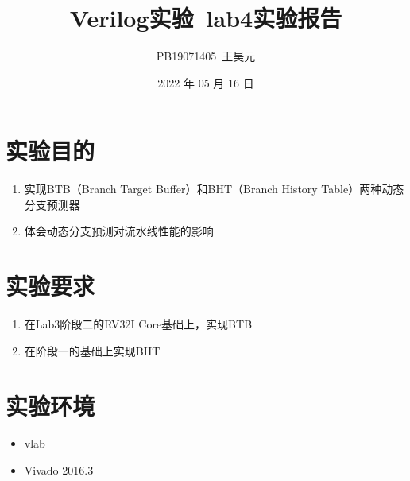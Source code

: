 \documentclass[UTF8]{article}
\title{Verilog实验\ lab4实验报告}
\author{PB19071405\ 王昊元}
\date{2022 年 05 月 16 日}
\begin{document}
    \maketitle
    \section{实验目的}
    \begin{enumerate}
        \item 实现BTB（Branch Target Buffer）和BHT（Branch History Table）两种动态分支预测器
        \item 体会动态分支预测对流水线性能的影响
    \end{enumerate}
    \section{实验要求}
    \begin{enumerate}
        \item 在Lab3阶段二的RV32I Core基础上，实现BTB
        \item 在阶段一的基础上实现BHT
    \end{enumerate}
    \section{实验环境}
    \begin{itemize}
        \item vlab
        \item Vivado 2016.3
    \end{itemize}
\end{document}
